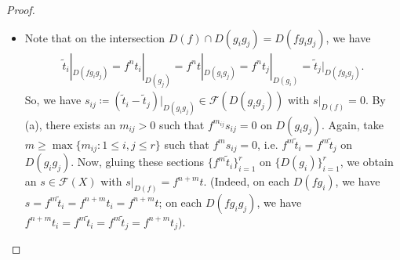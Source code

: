 \documentclass[11pt,a4paper,footinclude=true,headinclude=true]{scrbook} %
\newcommand{\FF}{\mathscr{F}}
\newcommand{\<}{\langle}
\newcommand{\>}{\rangle}
\begin{document}
\begin{proof}
\begin{itemize}
\begin{itemize}
            \item Note that on the intersection $D(f)\cap D(g_ig_j)=D(fg_ig_j)$, we have
            \begin{align*}
                \tilde{t}_i|_{D(fg_ig_j)}=f^nt_i|_{D(g_j)}=f^nt|_{D(g_ig_j)}=f^nt_j|_{D(g_i)}=\tilde{t}_j|_{D(fg_ig_j)}.
            \end{align*}
            So, we have $s_{ij}\coloneqq(\tilde{t}_i-\tilde{t}_j)|_{D(g_ig_j)}\in\FF(D(g_ig_j))$ with $s|_{D(f)}=0$. By (a), there exists an $m_{ij}>0$ such that $f^{m_{ij}}s_{ij}=0$ on $D(g_ig_j)$. Again, take $m\geq\max\{m_{ij}:1\leq i,j\leq r\}$ such that $f^ms_{ij}=0$, i.e. $f^m\tilde{t}_i=f^m\tilde{t}_j$ on $D(g_ig_j)$. Now, gluing these sections $\{f^m\tilde{t}_i\}_{i=1}^r$ on $\{D(g_i)\}_{i=1}^r$, we obtain an $s\in\FF(X)$ with $s|_{D(f)}=f^{n+m}t$. (Indeed, on each $D(fg_i)$, we have $s=f^m\tilde{t}_i=f^{n+m}t_i=f^{n+m}t$; on each $D(fg_ig_j)$, we have $f^{n+m}t_i=f^m\tilde{t}_i=f^m\tilde{t}_j=f^{n+m}t_j$).
        \end{itemize}
    \end{itemize}
\end{proof}
\end{document}
